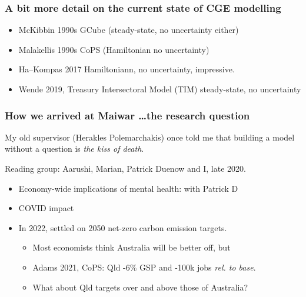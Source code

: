 \documentclass[handout,english]{beamer}
\begin{document}
\begin{frame}
  \frametitle{A bit more detail on the current state of CGE modelling}
  \begin{itemize}
      \item McKibbin 1990s GCube (steady-state, no uncertainty either)
      \item Malakellis 1990s CoPS (Hamiltonian no uncertainty)
      \item Ha--Kompas 2017 Hamiltoniann, no uncertainty, impressive.
      \item Wende 2019, Treasury Intersectoral Model (TIM) steady-state,
        no uncertainty
  \end{itemize}
\end{frame}
\begin{frame}
  \frametitle{How we arrived at Maiwar \dots the research question}
  My old supervisor (Herakles Polemarchakis) once told me that building a model
  without a question is \emph{the kiss of death}.

  Reading group: Aarushi, Marian, Patrick Duenow and I, late 2020.
  \begin{itemize}
    \item Economy-wide implications of mental health: with Patrick D
    \item COVID impact
    \item In 2022, settled on 2050 net-zero carbon emission targets.
    \begin{itemize}
      \item Most economists think Australia will be better off, but
      \item Adams 2021, CoPS: Qld -6\% GSP and -100k jobs \emph{rel. to base}.
      \item What about Qld targets over and above those of Australia?
    \end{itemize}
  \end{itemize}
\end{frame}
\end{document}
